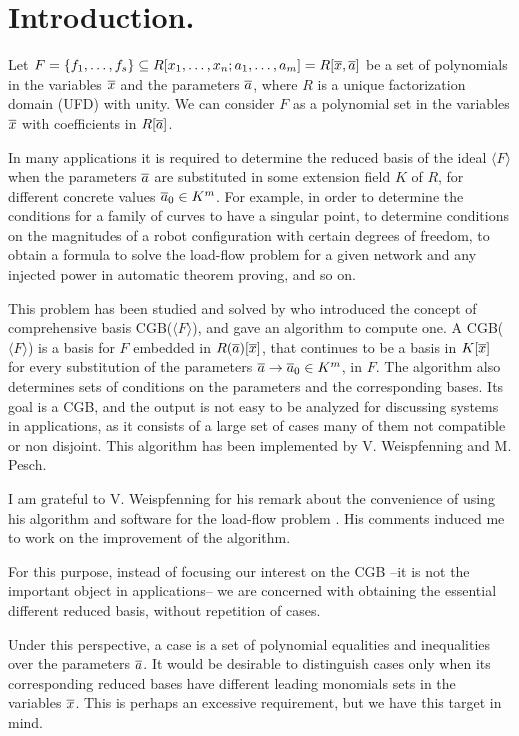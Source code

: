 \section{Introduction.}

 Let $F=\{f_1,\dots,f_s\} \subseteq R[x_1,\dots,x_n;a_1,\dots,a_m]=R[\overline{x},\overline{a}]$
 be a set of polynomials in the variables $\overline{x}$
 and the parameters $\overline{a}$, where $R$
 is a unique factorization domain (UFD) with unity.
 We can consider $F$ as a polynomial set in the variables $\overline{x}$
 with coefficients in $R[\overline{a}]$.

In many applications it is required to determine the reduced \Gr
basis of the ideal $\langle F \rangle$ when the parameters $\overline{a}$
are substituted in some extension field $K$ of $R$, for different
concrete values $\overline{a}_0 \in K^m$. For example, in order to
determine the conditions for a family of curves to have a singular
point, to determine conditions on the magnitudes of a robot
configuration with certain degrees of freedom, to obtain a formula
to solve the load-flow problem for a given network and any
injected power \cite{Montes95, Montes98} in automatic theorem
proving, and so on.

This problem has been studied and solved by  who
introduced the concept of comprehensive \Gr basis {\sc
CGB}($\langle F\rangle$), and gave an algorithm to compute one. A
{\sc CGB}($\langle F \rangle$) is a \Gr basis for $F$ embedded in
$R(\overline{a})[\overline{x}]$, that continues to be a \Gr basis
in $K[\overline{x}]$ for every substitution of the parameters $\overline{a}
\rightarrow \overline{a}_{0} \in K^m$, in $F$. The algorithm also
determines sets of conditions on the parameters and the
corresponding \Gr bases. Its goal is a {\sc CGB}, and the output
is not easy to be analyzed for discussing systems in applications,
as it consists of a large set of cases many of them not compatible
or non disjoint. This algorithm has been implemented by V.
Weispfenning and M. Pesch.

I am grateful to V. Weispfenning for his remark about the
convenience of using his algorithm and software for the load-flow
problem \cite{Montes95}. His comments induced me to work on the
improvement of the algorithm.

For this purpose, instead of focusing our interest on the {\sc
CGB} --it is not the important object in applications-- we are
concerned with obtaining the essential different reduced \Gr
basis, without repetition of cases.

Under this perspective, a case is a set of polynomial equalities
and inequalities over the parameters $\overline{a}$. It would be desirable
to distinguish cases only when its corresponding reduced
\Gr bases have different leading monomials sets in the variables
$\overline{x}$. This is perhaps an excessive requirement, but we have this
target in mind.

